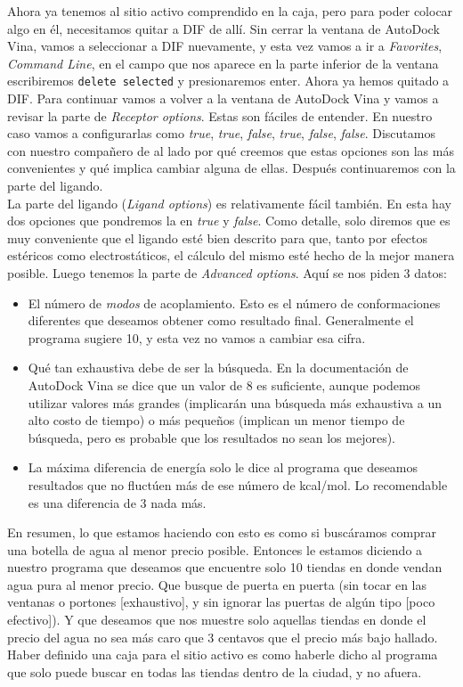 \documentclass[10pt,letterpaper]{article}
\newcommand{\inlinecode}[1]{
\colorbox{light-gray}{\texttt{#1}}
}
\begin{document}
Ahora ya tenemos al sitio activo comprendido en la caja, pero para poder colocar algo en \'el, necesitamos quitar a DIF de all\'i. Sin cerrar la ventana de AutoDock Vina, vamos a seleccionar a DIF nuevamente, y esta vez vamos a ir a \emph{Favorites}, \emph{Command Line}, en el campo que nos aparece en la parte inferior de la ventana escribiremos \inlinecode{delete selected} y presionaremos enter. Ahora ya hemos quitado a DIF. Para continuar vamos a volver a la ventana de AutoDock Vina y vamos a revisar la parte de \emph{Receptor options}. Estas son f\'aciles de entender. En nuestro caso vamos a configurarlas como \emph{true}, \emph{true}, \emph{false}, \emph{true}, \emph{false}, \emph{false}. Discutamos con nuestro compa\~nero de al lado por qu\'e creemos que estas opciones son las m\'as convenientes y qu\'e implica cambiar alguna de ellas. Despu\'es continuaremos con la parte del ligando.\\

La parte del ligando (\emph{Ligand options}) es relativamente f\'acil tambi\'en. En esta hay dos opciones que pondremos la en \emph{true} y \emph{false}. Como detalle, solo diremos que es muy conveniente que el ligando est\'e bien descrito para que, tanto por efectos est\'ericos como electrost\'aticos, el c\'alculo del mismo est\'e hecho de la mejor manera posible. Luego tenemos la parte de \emph{Advanced options}. Aqu\'i se nos piden 3 datos:

\begin{itemize}
\item El n\'umero de \textit{modos} de acoplamiento. Esto es el n\'umero de conformaciones diferentes que deseamos obtener como resultado final. Generalmente el programa sugiere 10, y esta vez no vamos a cambiar esa cifra.
\item Qu\'e tan exhaustiva debe de ser la b\'usqueda. En la documentaci\'on de AutoDock Vina se dice que un valor de 8 es suficiente, aunque podemos utilizar valores m\'as grandes (implicar\'an una b\'usqueda m\'as exhaustiva a un alto costo de tiempo) o m\'as peque\~nos (implican un menor tiempo de b\'usqueda, pero es probable que los resultados no sean los mejores).
\item La m\'axima diferencia de energ\'ia solo le dice al programa que deseamos resultados que no fluct\'uen m\'as de ese n\'umero de kcal/mol. Lo recomendable es una diferencia de 3 nada m\'as.
\end{itemize}

En resumen, lo que estamos haciendo con esto es como si busc\'aramos comprar una botella de agua al menor precio posible. Entonces le estamos diciendo a nuestro programa que deseamos que encuentre solo 10 tiendas en donde vendan agua pura al menor precio. Que busque de puerta en puerta (sin tocar en las ventanas o portones [exhaustivo], y sin ignorar las puertas de alg\'un tipo [poco efectivo]). Y que deseamos que nos muestre solo aquellas tiendas en donde el precio del agua no sea m\'as caro que 3 centavos que el precio m\'as bajo hallado. Haber definido una caja para el sitio activo es como haberle dicho al programa que solo puede buscar en todas las tiendas dentro de la ciudad, y no afuera.\\
\end{document}

